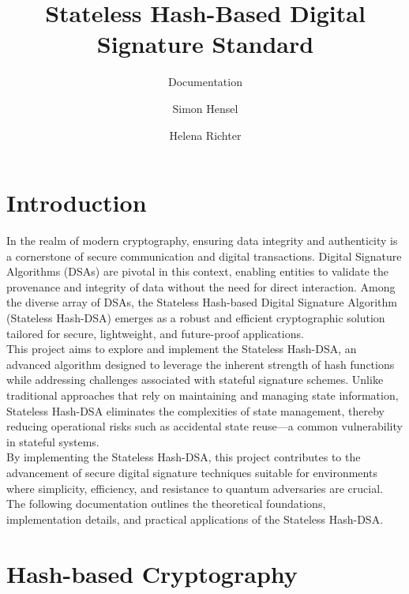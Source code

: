\documentclass[journal=tosc,notanonymous]{iacrtrans}
\author{Simon Hensel\inst{1} \and Helena Richter\inst{2}}
\institute{Albstadt-Sigmaringen University, Albstadt, Germany, \email{hensels1@hs-albsig.de} \and
	Albstadt-Sigmaringen University, Albstadt, Germany, \email{richtehe@hs-albsig.de}}
\title{Stateless Hash-Based Digital Signature Standard}
\subtitle{Documentation}
\begin{document}
\maketitle




\begin{abstract}
  \lipsum[1]
\end{abstract}


\section{Introduction}

In the realm of modern cryptography, ensuring data integrity and authenticity is a cornerstone of secure communication and digital transactions. Digital Signature Algorithms (DSAs) are pivotal in this context, enabling entities to validate the provenance and integrity of data without the need for direct interaction. Among the diverse array of DSAs, the Stateless Hash-based Digital Signature Algorithm (Stateless Hash-DSA) emerges as a robust and efficient cryptographic solution tailored for secure, lightweight, and future-proof applications.
\\
This project aims to explore and implement the Stateless Hash-DSA, an advanced algorithm designed to leverage the inherent strength of hash functions while addressing challenges associated with stateful signature schemes. Unlike traditional approaches that rely on maintaining and managing state information, Stateless Hash-DSA eliminates the complexities of state management, thereby reducing operational risks such as accidental state reuse—a common vulnerability in stateful systems.
\\
By implementing the Stateless Hash-DSA, this project contributes to the advancement of secure digital signature techniques suitable for environments where simplicity, efficiency, and resistance to quantum adversaries are crucial. The following documentation outlines the theoretical foundations, implementation details, and practical applications of the Stateless Hash-DSA.

\section{Hash-based Cryptography}
\end{document}
